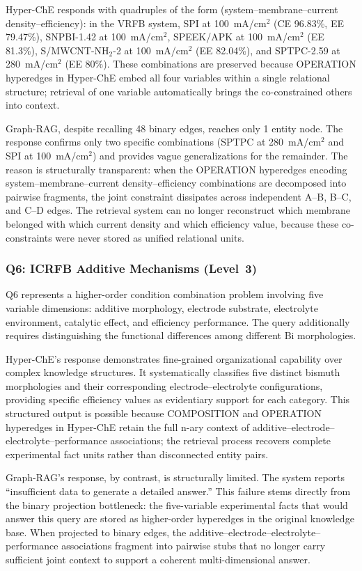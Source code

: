 \documentclass[11pt,a4paper]{article}
\begin{document}
Hyper-ChE responds with quadruples of the form (system--membrane--current density--efficiency): in the VRFB system, SPI at 100~mA/cm$^2$ (CE 96.83\%, EE 79.47\%), SNPBI-1.42 at 100~mA/cm$^2$, SPEEK/APK at 100~mA/cm$^2$ (EE 81.3\%), S/MWCNT-NH$_2$-2 at 100~mA/cm$^2$ (EE 82.04\%), and SPTPC-2.59 at 280~mA/cm$^2$ (EE 80\%). These combinations are preserved because OPERATION hyperedges in Hyper-ChE embed all four variables within a single relational structure; retrieval of one variable automatically brings the co-constrained others into context.

Graph-RAG, despite recalling 48 binary edges, reaches only 1 entity node. The response confirms only two specific combinations (SPTPC at 280~mA/cm$^2$ and SPI at 100~mA/cm$^2$) and provides vague generalizations for the remainder. The reason is structurally transparent: when the OPERATION hyperedges encoding system--membrane--current density--efficiency combinations are decomposed into pairwise fragments, the joint constraint dissipates across independent A--B, B--C, and C--D edges. The retrieval system can no longer reconstruct which membrane belonged with which current density and which efficiency value, because these co-constraints were never stored as unified relational units.

\subsubsection{Q6: ICRFB Additive Mechanisms (Level~3)}

Q6 represents a higher-order condition combination problem involving five variable dimensions: additive morphology, electrode substrate, electrolyte environment, catalytic effect, and efficiency performance. The query additionally requires distinguishing the functional differences among different Bi morphologies.

Hyper-ChE's response demonstrates fine-grained organizational capability over complex knowledge structures. It systematically classifies five distinct bismuth morphologies and their corresponding electrode--electrolyte configurations, providing specific efficiency values as evidentiary support for each category. This structured output is possible because COMPOSITION and OPERATION hyperedges in Hyper-ChE retain the full n-ary context of additive--electrode--electrolyte--performance associations; the retrieval process recovers complete experimental fact units rather than disconnected entity pairs.

Graph-RAG's response, by contrast, is structurally limited. The system reports ``insufficient data to generate a detailed answer.'' This failure stems directly from the binary projection bottleneck: the five-variable experimental facts that would answer this query are stored as higher-order hyperedges in the original knowledge base. When projected to binary edges, the additive--electrode--electrolyte--performance associations fragment into pairwise stubs that no longer carry sufficient joint context to support a coherent multi-dimensional answer.
\end{document}
